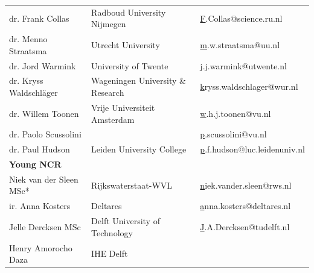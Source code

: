 \begin{longtable}{@{}lll@{}}
\rowcolor[HTML]{B9C6D5} 
dr. Frank Collas                       & Radboud University   Nijmegen                         & {\color[HTML]{0563C1} {\ul F.Collas@science.ru.nl}}          \\
\rowcolor[HTML]{C9D6D6} 
dr. Menno Straatsma                    & Utrecht University                                    & {\color[HTML]{0563C1} {\ul m.w.straatsma@uu.nl}}             \\
\rowcolor[HTML]{B9C6D5} 
dr. Jord Warmink                       & University of Twente                                  & {\color[HTML]{0563C1} {\ul j.j.warmink@utwente.nl}}          \\
\rowcolor[HTML]{C9D6D6} 
dr. Kryss Waldschläger                 & Wageningen   University \& Research                   & {\color[HTML]{0563C1} {\ul kryss.waldschlager@wur.nl}}       \\
\rowcolor[HTML]{B9C6D5} 
dr. Willem Toonen                      & Vrije Universiteit   Amsterdam                        & {\color[HTML]{0563C1} {\ul w.h.j.toonen@vu.nl}}              \\
\rowcolor[HTML]{C9D6D6} 
dr. Paolo Scussolini                   &                                                       & {\color[HTML]{0563C1} {\ul p.scussolini@vu.nl}}              \\
\rowcolor[HTML]{B9C6D5} 
dr. Paul Hudson                        & Leiden University   College                           & {\color[HTML]{0563C1} {\ul p.f.hudson@luc.leidenuniv.nl}}    \\
\rowcolor[HTML]{C9D6D6} 
\textbf{Young NCR}                     &                                                       &                                                              \\
\rowcolor[HTML]{B9C6D5} 
Niek van der Sleen MSc*                & Rijkswaterstaat-WVL                                   & {\color[HTML]{0563C1} {\ul niek.vander.sleen@rws.nl}}        \\
\rowcolor[HTML]{C9D6D6} 
ir. Anna Kosters                       & Deltares                                              & {\color[HTML]{0563C1} {\ul anna.kosters@deltares.nl}}        \\
\rowcolor[HTML]{B9C6D5} 
Jelle Dercksen MSc                     & Delft University of   Technology                      & {\color[HTML]{0563C1} {\ul J.A.Dercksen@tudelft.nl}}         \\
\rowcolor[HTML]{C9D6D6} 
Henry Amorocho Daza                    & IHE Delft          & {\color[HTML]{0563C1} {\ul }}                                \\

\end{longtable}
